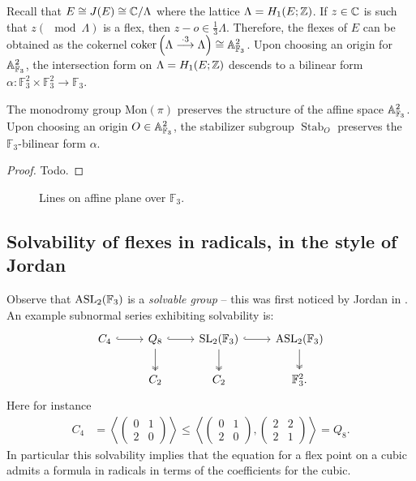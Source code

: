 \documentclass[11pt]{amsart}
\providecommand{\ASL}{\mathrm{ASL}}
\providecommand{\Mon}{\mathrm{Mon}}
\begin{document}
Recall that $E\cong J(E) \cong \mathbb{C}/ \Lambda$ where the lattice $\Lambda = H_1(E; \mathbb{Z})$. If $z\in \mathbb{C}$ is such that $z (\mod \Lambda)$ is a flex, then $z-o \in \frac{1}{3}\Lambda$. Therefore, the flexes of $E$ can be obtained as the cokernel $\operatorname{coker}\left(\Lambda \overset{\cdot 3}{\longrightarrow} \Lambda\right) \cong \mathbb{A}^2_{\mathbb{F}_3}$.
Upon choosing an origin for $\mathbb{A}^2_{\mathbb{F}_3}$, the intersection form on $\Lambda = H_1(E; \mathbb{Z})$ descends to a bilinear form $\alpha: \mathbb{F}_3^2 \times \mathbb{F}_3^2 \to \mathbb{F}_3$. 

\begin{proposition}
    The monodromy group $\Mon(\pi)$ preserves the structure of the affine space $\mathbb{A}^2_{\mathbb{F}_3}$. Upon choosing an origin $O \in \mathbb{A}^2_{\mathbb{F}_3}$, the stabilizer subgroup $\operatorname{Stab}_O$ preserves the $\mathbb{F}_3$-bilinear form $\alpha$. 
\end{proposition}

\begin{proof}
    Todo.
\end{proof}

\begin{figure}
    
    \caption{Lines on affine plane over $\mathbb{F}_3$.}
    \label{fig: A2 F3}
\end{figure}


\subsection{Solvability of flexes in radicals, in the style of Jordan}

Observe that $\ASL_2(\F_3)$ is a \textit{solvable group} -- this was first noticed by Jordan in \cite[III.III\S1]{Jordan}. An example subnormal series exhibiting solvability is:
\[ \begin{tikzcd}
    C_4\rar[hook] & Q_8\rar[hook]\dar[two heads] & \SL_2(\F_3)\dar[two heads]\rar[hook] & \ASL_2(\F_3)\dar[two heads]\\
     & C_2 & C_2 & \F_3^2.
\end{tikzcd} \]
Here for instance
\begin{align*}
    C_4 &= \left\langle \begin{pmatrix} 0 & 1 \\ 2 & 0 \end{pmatrix}  \right\rangle \le \left\langle \begin{pmatrix} 0 & 1 \\ 2 & 0 \end{pmatrix}, \begin{pmatrix} 2 & 2 \\ 2 & 1 \end{pmatrix}  \right\rangle = Q_8.
\end{align*}
In particular this solvability implies that the equation for a flex point on a cubic admits a formula in radicals in terms of the coefficients for the cubic.
\end{document}
